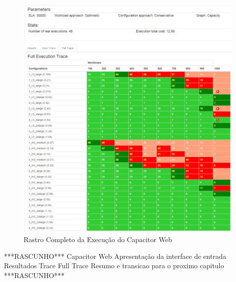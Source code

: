 \begin{figure}[htb]
  \caption{\label{fig:capacitor_web_results}Rastro Completo da Execução do Capacitor Web}
  \begin{center}
    \includegraphics[scale=0.5]{img/CapacitorWeb_FullTrace}
  \end{center}
\end{figure}

***RASCUNHO***
Capacitor Web
  Apresentação da interface de entrada
  Resultados
  Trace
  Full Trace
Resumo e transicao para o proximo capitulo
***RASCUNHO***

 
